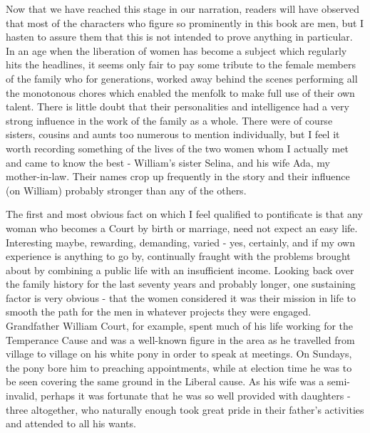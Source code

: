 
Now that we have reached this stage in our narration, readers will have observed that most of the characters who figure so prominently in this book are men, but I hasten to assure them that this is not intended to prove anything in particular. In an age when the liberation of women has become a subject which regularly hits the headlines, it seems only fair to pay some tribute to the female members of the family who for generations, worked away behind the scenes performing all the monotonous chores which enabled the menfolk to make full use of their own talent. There is little doubt that their personalities and intelligence had a very strong influence in the work of the family as a whole. There were of course sisters, cousins and aunts too numerous to mention individually, but I feel it worth recording something of the lives of the two women whom I actually met and came to know the best - William's sister Selina, and his wife Ada, my mother-in-law. Their names crop up frequently in the story and their influence (on William) probably stronger than any of the others.

The first and most obvious fact on which I feel qualified to pontificate is that any woman who becomes a Court by birth or marriage, need not expect an easy life. Interesting maybe, rewarding, demanding, varied - yes, certainly, and if my own experience is anything to go by, continually fraught with the problems brought about by combining a public life with an insufficient income. Looking back over the family history for the last seventy years and probably longer, one sustaining factor is very obvious - that the women considered it was their mission in life to smooth the path for the men in whatever projects they were engaged. Grandfather William Court, for example, spent much of his life working for the Temperance Cause and was a well-known figure in the area as he travelled from village to village on his white pony in order to speak at meetings. On Sundays, the pony bore him to preaching appointments, while at election time he was to be seen covering the same ground in the Liberal cause. As his wife was a semi-invalid, perhaps it was fortunate that he was so well provided with daughters - three altogether, who naturally enough took great pride in their father's activities and attended to all his wants.

